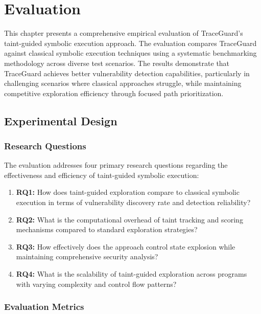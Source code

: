 \chapter{Evaluation}

This chapter presents a comprehensive empirical evaluation of TraceGuard's taint-guided symbolic execution approach. The evaluation compares TraceGuard against classical symbolic execution techniques using a systematic benchmarking methodology across diverse test scenarios. The results demonstrate that TraceGuard achieves better vulnerability detection capabilities, particularly in challenging scenarios where classical approaches struggle, while maintaining competitive exploration efficiency through focused path prioritization.

\section{Experimental Design}

\subsection{Research Questions}\label{subsec:research_questions}

The evaluation addresses four primary research questions regarding the effectiveness and efficiency of taint-guided symbolic execution:

\begin{enumerate}
    \item \textbf{RQ1:} How does taint-guided exploration compare to classical symbolic execution in terms of vulnerability discovery rate and detection reliability?
    \item \textbf{RQ2:} What is the computational overhead of taint tracking and scoring mechanisms compared to standard exploration strategies?
    \item \textbf{RQ3:} How effectively does the approach control state explosion while maintaining comprehensive security analysis?
    \item \textbf{RQ4:} What is the scalability of taint-guided exploration across programs with varying complexity and control flow patterns?
\end{enumerate}

\subsection{Evaluation Metrics}

